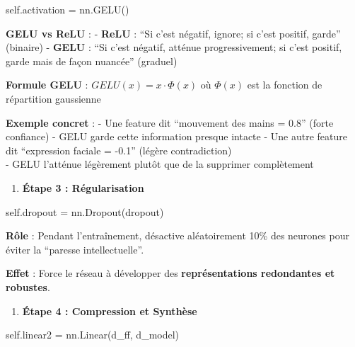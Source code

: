 \documentclass[12pt]{article}
\providecommand{\tightlist}{%
      \setlength{\itemsep}{0pt}\setlength{\parskip}{0pt}}
\newenvironment{Shaded}{}{}
\newcommand{\NormalTok}[1]{{#1}}
\newcommand{\VariableTok}[1]{\textcolor[rgb]{0.10,0.09,0.49}{{#1}}}
\newcommand{\OperatorTok}[1]{\textcolor[rgb]{0.40,0.40,0.40}{{#1}}}
\begin{document}
\begin{Shaded}
\begin{Highlighting}[]
\VariableTok{self}\NormalTok{.activation }\OperatorTok{=}\NormalTok{ nn.GELU()}
\end{Highlighting}
\end{Shaded}

\textbf{GELU vs ReLU} : - \textbf{ReLU} : ``Si c'est négatif, ignore; si
c'est positif, garde'' (binaire) - \textbf{GELU} : ``Si c'est négatif,
atténue progressivement; si c'est positif, garde mais de façon nuancée''
(graduel)

\textbf{Formule GELU} : \(GELU(x) = x \cdot \Phi(x)\) où \(\Phi(x)\) est
la fonction de répartition gaussienne

\textbf{Exemple concret} : - Une feature dit ``mouvement des mains =
0.8'' (forte confiance) - GELU garde cette information presque intacte -
Une autre feature dit ``expression faciale = -0.1'' (légère
contradiction)\\
- GELU l'atténue légèrement plutôt que de la supprimer complètement

\begin{enumerate}
\def\labelenumi{\arabic{enumi}.}
\setcounter{enumi}{2}
\tightlist
\item
  \textbf{Étape 3 : Régularisation}
\end{enumerate}

\begin{Shaded}
\begin{Highlighting}[]
\VariableTok{self}\NormalTok{.dropout }\OperatorTok{=}\NormalTok{ nn.Dropout(dropout)}
\end{Highlighting}
\end{Shaded}

\textbf{Rôle} : Pendant l'entraînement, désactive aléatoirement 10\% des
neurones pour éviter la ``paresse intellectuelle''.

\textbf{Effet} : Force le réseau à développer des
\textbf{représentations redondantes et robustes}.

\begin{enumerate}
\def\labelenumi{\arabic{enumi}.}
\setcounter{enumi}{3}
\tightlist
\item
  \textbf{Étape 4 : Compression et Synthèse}
\end{enumerate}

\begin{Shaded}
\begin{Highlighting}[]
\VariableTok{self}\NormalTok{.linear2 }\OperatorTok{=}\NormalTok{ nn.Linear(d\_ff, d\_model)}
\end{Highlighting}
\end{Shaded}
\end{document}
